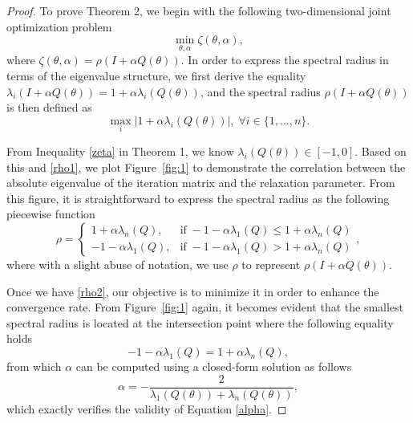 \documentclass[letterpaper]{article} %
\begin{document}
\begin{proof} To prove Theorem 2, we begin with the following two-dimensional joint optimization problem
\begin{equation}\label{joint}
	\min_{\theta, \alpha} \zeta\left(\theta, \alpha \right),
\end{equation}
where $\zeta\left(\theta, \alpha \right)=\rho(I+\alpha Q(\theta))$. In order to express the spectral radius in terms of the eigenvalue structure, we first derive the equality $ \lambda_i \left(I+\alpha Q(\theta)\right) = 1 + \alpha \lambda_i\left(Q(\theta)\right)$, and the spectral radius $\rho(I+\alpha Q(\theta))$ is then defined as
\begin{equation}\label{rho1}
  \max_i |1 + \alpha \lambda_i\left(Q(\theta)\right)|,\; \forall i \in \{1,...,n\}.
\end{equation}

From Inequality \eqref{zeta} in Theorem 1, we know $\lambda_i\left(Q(\theta)\right) \in [-1,0]$. Based on this and \eqref{rho1}, we plot Figure~\ref{fig:1} to demonstrate the correlation between the absolute eigenvalue of the iteration matrix and the relaxation parameter. From this figure, it is straightforward to express the spectral radius as the following piecewise function
\begin{equation}\label{rho2}
	\rho=
	\begin{cases}
		1+\alpha \lambda_n (Q), & \text{if}\;-1 - \alpha \lambda_1(Q)\leq 1 + \alpha \lambda_n(Q)\\
		-1-\alpha \lambda_1 (Q), & \text{if}\;-1 - \alpha \lambda_1(Q) > 1 + \alpha \lambda_n(Q)
	\end{cases},
\end{equation}
where with a slight abuse of notation, we use $\rho $ to represent $\rho(I+\alpha Q(\theta))$.

Once we have \eqref{rho2}, our objective is to minimize it in order to enhance the convergence rate. From Figure~\ref{fig:1} again, it becomes evident that the smallest spectral radius is located at the intersection point where the following equality holds
\begin{equation*}
    -1 - \alpha \lambda_1(Q) = 1 + \alpha \lambda_n(Q),
\end{equation*}
from which $\alpha$ can be computed using a closed-form solution as follows
\begin{equation*}
  \alpha = -\frac{2}{\lambda_1\left(Q\left(\theta\right)\right)+\lambda_n\left(Q\left(\theta\right)\right)},
\end{equation*}
which exactly verifies the validity of Equation \eqref{alpha}.
\end{proof}
\end{document}

